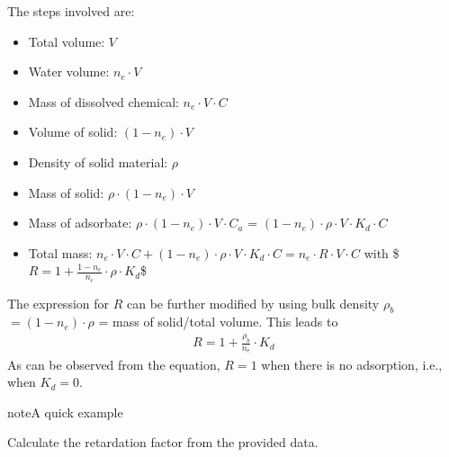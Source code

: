 \documentclass[letterpaper,10pt,english]{jupyterBook}
\begin{document}
\sphinxAtStartPar
The steps involved are:
\begin{itemize}
\item {} 
\sphinxAtStartPar
Total volume: \(V\)

\item {} 
\sphinxAtStartPar
Water volume: \(n_e \cdot V\)

\item {} 
\sphinxAtStartPar
Mass of dissolved chemical: \(n_e \cdot V \cdot C\)

\item {} 
\sphinxAtStartPar
Volume of solid: \((1-n_e)\cdot V\)

\item {} 
\sphinxAtStartPar
Density of solid material: \(\rho\)

\item {} 
\sphinxAtStartPar
Mass of solid: \(\rho \cdot(1-n_e)\cdot V\)

\item {} 
\sphinxAtStartPar
Mass of adsorbate: \(\rho \cdot(1-n_e)\cdot V\cdot C_a\) = \((1-n_e)\cdot\rho \cdot V \cdot K_d \cdot C\)

\item {} 
\sphinxAtStartPar
Total mass: \(n_e\cdot V \cdot C + (1-n_e)\cdot\rho \cdot V\cdot K_d \cdot C = n_e \cdot R \cdot V \cdot C\) 
with  \$\(R = 1 + \frac{1-n_e}{n_e}\cdot \rho \cdot K_d\)\$

\end{itemize}

\sphinxAtStartPar
The expression for \(R\) can be further modified  by using bulk density \(\rho_b\) \(= (1-n_e)\cdot \rho\) = mass of solid/total volume. This leads to
\begin{equation*}
\begin{split}
R = 1+\frac{\rho_b}{n_e} \cdot K_d
\end{split}
\end{equation*}
\sphinxAtStartPar
As can be observed from the equation, \(R = 1\) when there is no adsorption, i.e., when \(K_d= 0\).

\begin{sphinxadmonition}{note}{A quick example}

\sphinxAtStartPar
Calculate the retardation factor from the provided data.
\end{sphinxadmonition}
\end{document}
